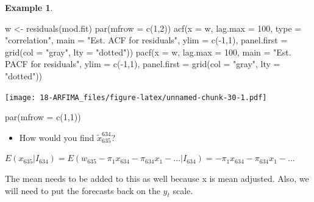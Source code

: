 \documentclass[
]{book}
\newenvironment{Shaded}{\begin{snugshade}}{\end{snugshade}}
\newcommand{\AttributeTok}[1]{\textcolor[rgb]{0.77,0.63,0.00}{#1}}
\newcommand{\DecValTok}[1]{\textcolor[rgb]{0.00,0.00,0.81}{#1}}
\newcommand{\FunctionTok}[1]{\textcolor[rgb]{0.00,0.00,0.00}{#1}}
\newcommand{\NormalTok}[1]{#1}
\newcommand{\OtherTok}[1]{\textcolor[rgb]{0.56,0.35,0.01}{#1}}
\newcommand{\SpecialCharTok}[1]{\textcolor[rgb]{0.00,0.00,0.00}{#1}}
\newcommand{\StringTok}[1]{\textcolor[rgb]{0.31,0.60,0.02}{#1}}
\providecommand{\tightlist}{%
  \setlength{\itemsep}{0pt}\setlength{\parskip}{0pt}}
\theoremstyle{definition}
\theoremstyle{definition}
\newtheorem{example}{Example}[chapter]
\theoremstyle{definition}
\theoremstyle{definition}
\theoremstyle{remark}
\begin{document}
\begin{example}
\begin{Shaded}
\begin{Highlighting}[]
\NormalTok{w }\OtherTok{\textless{}{-}} \FunctionTok{residuals}\NormalTok{(mod.fit) }
\FunctionTok{par}\NormalTok{(}\AttributeTok{mfrow =} \FunctionTok{c}\NormalTok{(}\DecValTok{1}\NormalTok{,}\DecValTok{2}\NormalTok{))}
\FunctionTok{acf}\NormalTok{(}\AttributeTok{x =}\NormalTok{ w, }\AttributeTok{lag.max =} \DecValTok{100}\NormalTok{, }\AttributeTok{type =} \StringTok{"correlation"}\NormalTok{, }\AttributeTok{main =} 
    \StringTok{"Est. ACF for residuals"}\NormalTok{, }\AttributeTok{ylim =} \FunctionTok{c}\NormalTok{(}\SpecialCharTok{{-}}\DecValTok{1}\NormalTok{,}\DecValTok{1}\NormalTok{), }\AttributeTok{panel.first =} 
    \FunctionTok{grid}\NormalTok{(}\AttributeTok{col =} \StringTok{"gray"}\NormalTok{, }\AttributeTok{lty =} \StringTok{"dotted"}\NormalTok{))}
\FunctionTok{pacf}\NormalTok{(}\AttributeTok{x =}\NormalTok{ w, }\AttributeTok{lag.max =} \DecValTok{100}\NormalTok{, }\AttributeTok{main =} \StringTok{"Est. PACF for }
\StringTok{    residuals"}\NormalTok{, }\AttributeTok{ylim =} \FunctionTok{c}\NormalTok{(}\SpecialCharTok{{-}}\DecValTok{1}\NormalTok{,}\DecValTok{1}\NormalTok{), }\AttributeTok{panel.first =} 
    \FunctionTok{grid}\NormalTok{(}\AttributeTok{col =} \StringTok{"gray"}\NormalTok{, }\AttributeTok{lty =} \StringTok{"dotted"}\NormalTok{))}
\end{Highlighting}
\end{Shaded}

\texttt{[image: 18-ARFIMA\_files/figure-latex/unnamed-chunk-30-1.pdf]}

\begin{Shaded}
\begin{Highlighting}[]
\FunctionTok{par}\NormalTok{(}\AttributeTok{mfrow =} \FunctionTok{c}\NormalTok{(}\DecValTok{1}\NormalTok{,}\DecValTok{1}\NormalTok{))}
\end{Highlighting}
\end{Shaded}

\begin{itemize}
\tightlist
\item
  How would you find \(\tilde x^{634}_{635}\)?
\end{itemize}

\(E(x_{635}|I_{634})=E(w_{635}-\pi_1x_{634}-\pi_{634}x_1-...|I_{634})=-\pi_1x_{634}-\pi_{634}x_1-...\)

The mean needs to be added to this as well because x is mean adjusted. Also, we will need to put the forecasts back on the \(y_t\) scale.


\end{example}
\end{document}

